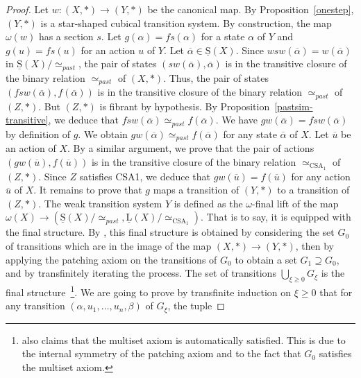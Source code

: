 \documentclass[a4paper,12pt]{amsart}
\begin{document}
\begin{proof} Let $w:(X,*)\to (Y,*)$ be the canonical map. By
Proposition~\ref{onestep}, $(Y,*)$ is a star-shaped cubical transition
system.  By construction, the map $\omega(w)$ has a section $s$. Let
$g(\alpha) = fs(\alpha)$ for a state $\alpha$ of $Y$ and $g(u) =
fs(u)$ for an action $u$ of $Y$. Let $\overline{\alpha}\in \operatorname{\underline{S}}(X)$.
Since $wsw(\overline{\alpha})=w(\overline{\alpha})$ in
$\operatorname{\underline{S}}(X)/\!\simeq_{past}$, the pair of states
$(sw(\overline{\alpha}),\overline{\alpha})$ is in the transitive
closure of the binary relation $\simeq_{past}$ of $(X,*)$. Thus, the
pair of states $(fsw(\overline{\alpha}),f(\overline{\alpha}))$ is in
the transitive closure of the binary relation $\simeq_{past}$ of
$(Z,*)$. But $(Z,*)$ is fibrant by hypothesis. By
Proposition~\ref{pastsim-transitive}, we deduce that
$fsw(\overline{\alpha}) \simeq_{past} f(\overline{\alpha})$.  We have
$gw(\overline{\alpha})=fsw(\overline{\alpha})$ by definition of
$g$. We obtain $gw(\overline{\alpha}) \simeq_{past}
f(\overline{\alpha})$ for any state $\overline{\alpha}$ of $X$. Let
$\overline{u}$ be an action of $X$. By a similar argument, we prove
that the pair of actions $(gw(\overline{u}),f(\overline{u}))$ is in
the transitive closure of the binary relation $\simeq_{\operatorname{CSA}_1}$ of
$(Z,*)$. Since $Z$ satisfies CSA1, we deduce that
$gw(\overline{u})=f(\overline{u})$ for any action $\overline{u}$ of
$X$. It remains to prove that $g$ maps a transition of $(Y,*)$ to a
transition of $(Z,*)$. The weak transition system $Y$ is defined as
the $\omega$-final lift of the map $\omega(X) \to
(\operatorname{\underline{S}}(X)/\!\simeq_{past},\operatorname{\underline{L}}(X)/\!\simeq_{\operatorname{CSA}_1})$. That is to say, it
is equipped with the final structure. By \cite[Proposition~3.5]{hdts},
this final structure is obtained by considering the set $G_0$ of
transitions which are in the image of the map $(X,*)\to (Y,*)$, then
by applying the patching axiom on the transitions of $G_0$ to obtain a
set $G_1 \supseteq G_0$, and by transfinitely iterating the
process. The set of transitions $\bigcup_{\xi{\geqslant} 0} G_\xi$ is the
final structure~\footnote{\cite[Proposition~3.5]{hdts} also claims
  that the multiset axiom is automatically satisfied. This is due to
  the internal symmetry of the patching axiom and to the fact that
  $G_0$ satisfies the multiset axiom.}. We are going to prove by
transfinite induction on $\xi {\geqslant} 0$ that for any transition
$(\alpha,u_1,\dots,u_n,\beta)$ of $G_\xi$, the tuple

\end{proof}
\end{document}

